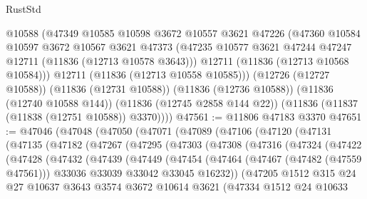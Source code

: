 \begin{lexlean}{RustStd}
\begin{coremodule}
        @10588
        (@47349
          @10585
          @10598
          @3672
          @10557
          @3621
          @47226
          (@47360
            @10584
            @10597
            @3672
            @10567
            @3621
            @47373
            (@47235 @10577 @3621 @47244 @47247 @12711 (@11836 (@12713 @10578 @3643)))
            @12711
            (@11836 (@12713 @10568 @10584)))
          @12711
          (@11836 (@12713 @10558 @10585)))
        (@12726 (@12727 @10588))
        (@11836 (@12731 @10588))
        (@11836 (@12736 @10588))
        (@11836 (@12740 @10588 @144))
        (@11836 (@12745 @2858 @144 @22))
        (@11836 (@11837 (@11838 (@12751 @10588)) @3370))))
@47561 := @11806 @47183 @3370
@47651 := @47046
    (@47048
      (@47050
        (@47071
          (@47089
            (@47106
              (@47120
                (@47131
                  (@47135
                    (@47182
                      (@47267
                        (@47295
                          (@47303
                            (@47308
                              (@47316
                                (@47324
                                  (@47422
                                    (@47428
                                      (@47432
                                        (@47439
                                          (@47449
                                            (@47454
                                              (@47464
                                                (@47467 (@47482 (@47559 @47561)))
                                                @33036
                                                @33039
                                                @33042
                                                @33045
                                                @16232))
                                            (@47205
                                              @1512
                                              @315
                                              @24
                                              @27
                                              @10637
                                              @3643
                                              @3574
                                              @3672
                                              @10614
                                              @3621
                                              (@47334
                                                @1512
                                                @24
                                                @10633

\end{coremodule}
\end{lexlean}
